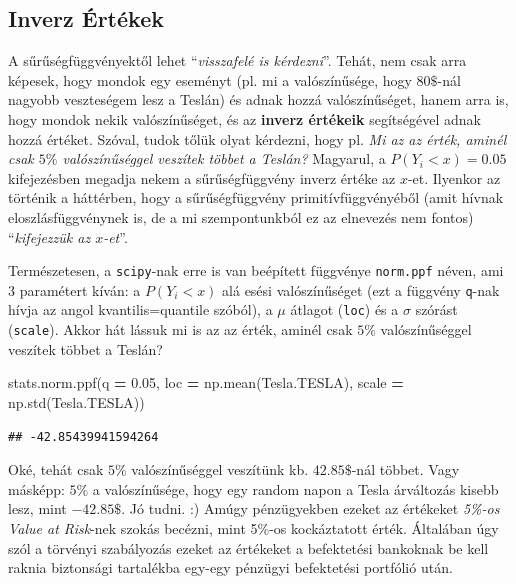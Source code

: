 \documentclass[
]{book}
\newenvironment{Shaded}{\begin{snugshade}}{\end{snugshade}}
\newcommand{\FloatTok}[1]{\textcolor[rgb]{0.00,0.00,0.81}{#1}}
\newcommand{\NormalTok}[1]{#1}
\newcommand{\OperatorTok}[1]{\textcolor[rgb]{0.81,0.36,0.00}{\textbf{#1}}}
\begin{document}
\subsection{Inverz Értékek}\label{inverz-uxe9rtuxe9kek}

A sűrűségfüggvényektől lehet ``\emph{visszafelé is kérdezni}''. Tehát, nem csak arra képesek, hogy mondok egy eseményt (pl. mi a valószínűsége, hogy \(80\$\)-nál nagyobb veszteségem lesz a Teslán) és adnak hozzá valószínűséget, hanem arra is, hogy mondok nekik valószínűséget, és az \textbf{inverz értékeik} segítségével adnak hozzá értéket. Szóval, tudok tőlük olyat kérdezni, hogy pl. \emph{Mi az az érték, aminél csak \(5\%\) valószínűséggel veszítek többet a Teslán?}
Magyarul, a \(P(Y_i < x) = 0.05\) kifejezésben megadja nekem a sűrűségfüggvény inverz értéke az \(x\)-et. Ilyenkor az történik a háttérben, hogy a sűrűségfüggvény primitívfüggvényéből (amit hívnak eloszlásfüggvénynek is, de a mi szempontunkból ez az elnevezés nem fontos) ``\emph{kifejezzük az \(x\)-et}''.

Természetesen, a \texttt{scipy}-nak erre is van beépített függvénye \texttt{norm.ppf} néven, ami 3 paramétert kíván: a \(P(Y_i < x)\) alá esési valószínűséget (ezt a függvény \texttt{q}-nak hívja az angol kvantilis=quantile szóból), a \(\mu\) átlagot (\texttt{loc}) és a \(\sigma\) szórást (\texttt{scale}).
Akkor hát lássuk mi is az az érték, aminél csak \(5\%\) valószínűséggel veszítek többet a Teslán?

\begin{Shaded}
\begin{Highlighting}[]
\NormalTok{stats.norm.ppf(q }\OperatorTok{=} \FloatTok{0.05}\NormalTok{, loc }\OperatorTok{=}\NormalTok{ np.mean(Tesla.TESLA), scale }\OperatorTok{=}\NormalTok{ np.std(Tesla.TESLA))}
\end{Highlighting}
\end{Shaded}

\begin{verbatim}
## -42.85439941594264
\end{verbatim}

Oké, tehát csak \(5\%\) valószínűséggel veszítünk kb. \(42.85\$\)-nál többet. Vagy másképp: \(5\%\) a valószínűsége, hogy egy random napon a Tesla árváltozás kisebb lesz, mint \(-42.85\$\). Jó tudni. :) Amúgy pénzügyekben ezeket az értékeket \emph{5\%-os Value at Risk}-nek szokás becézni, mint 5\%-os kockáztatott érték. Általában úgy szól a törvényi szabályozás ezeket az értékeket a befektetési bankoknak be kell raknia biztonsági tartalékba egy-egy pénzügyi befektetési portfólió után.
\end{document}
